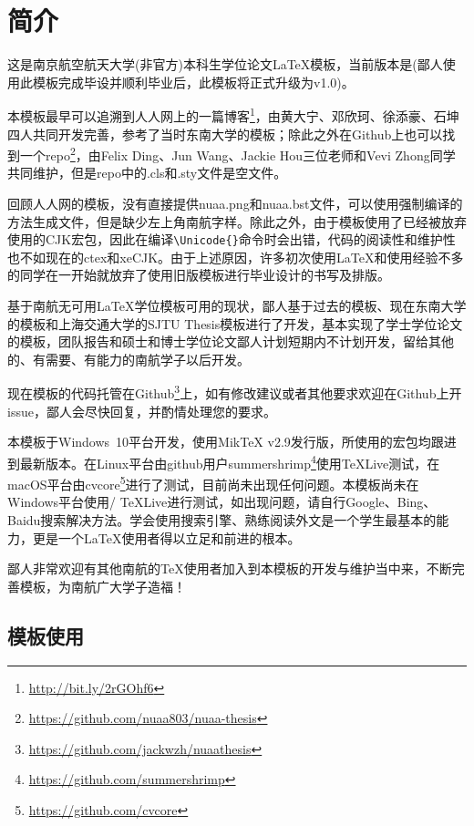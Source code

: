 \chapter{简介}\label{chap:intro}

这是南京航空航天大学(非官方)本科生学位论文\LaTeX 模板，当前版本是\version(鄙人使用此模板完成毕设并顺利毕业后，此模板将正式升级为v1.0)。

本模板最早可以追溯到人人网上的一篇博客\footnote{\url{http://bit.ly/2rGOhf6}}，由黄大宁、邓欣珂、徐添豪、石坤四人共同开发完善，参考了当时东南大学的\seuthesix 模板；除此之外在Github上也可以找到一个repo\footnote{\url{https://github.com/nuaa803/nuaa-thesis}}，由Felix Ding、Jun Wang、Jackie Hou三位老师和Vevi Zhong同学共同维护，但是repo中的.cls和.sty文件是空文件。

回顾人人网的模板，没有直接提供nuaa.png和nuaa.bst文件，可以使用强制编译的方法生成文件，但是缺少左上角南航字样。除此之外，由于模板使用了已经被放弃使用的CJK宏包，因此在编译\verb+\Unicode{}+命令时会出错，代码的阅读性和维护性也不如现在的ctex和xeCJK。由于上述原因，许多初次使用\LaTeX 和使用经验不多的同学在一开始就放弃了使用旧版模板进行毕业设计的书写及排版。

基于南航无可用\LaTeX 学位模板可用的现状，鄙人基于过去的\oldnuaathesis 模板、现在东南大学的\seuthesix 模板和上海交通大学的SJTU Thesis模板进行了开发，基本实现了学士学位论文的模板，团队报告和硕士和博士学位论文鄙人计划短期内不计划开发，留给其他的、有需要、有能力的南航学子以后开发。

现在\nuaathesis 模板的代码托管在Github\footnote{\url{https://github.com/jackwzh/nuaathesis}}上，如有修改建议或者其他要求欢迎在Github上开issue，鄙人会尽快回复，并酌情处理您的要求。

本模板于Windows~10平台开发，使用MikTeX v2.9发行版，所使用的宏包均跟进到最新版本。在Linux平台由github用户summershrimp\footnote{\url{https://github.com/summershrimp}}使用\TeX Live测试，在macOS平台由cvcore\footnote{\url{https://github.com/cvcore}}进行了测试，目前尚未出现任何问题。本模板尚未在Windows平台使用\CTeX / \TeX Live进行测试，如出现问题，请自行Google、Bing、Baidu搜索解决方法。学会使用搜索引擎、熟练阅读外文是一个学生最基本的能力，更是一个\LaTeX 使用者得以立足和前进的根本。

鄙人非常欢迎有其他南航的\TeX 使用者加入到本模板的开发与维护当中来，不断完善模板，为南航广大学子造福！

\section{模板使用}
